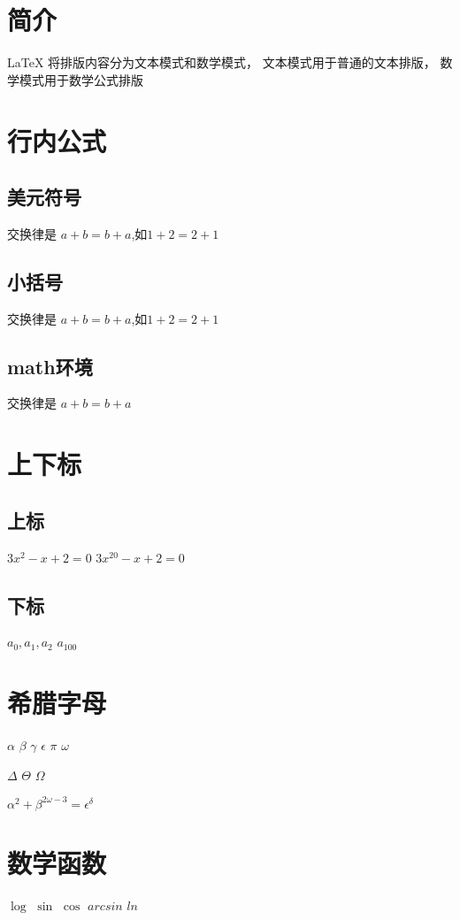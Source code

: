 \documentclass{ctexart}
\begin{document}
    \section{简介}
    LaTeX 将排版内容分为文本模式和数学模式，
    文本模式用于普通的文本排版，
    数学模式用于数学公式排版
    \section{行内公式}
    \subsection{美元符号}
    交换律是 $a+b=b+a$,如$1+2=2+1$
    \subsection{小括号}
    交换律是 \(a+b=b+a\),如\(1+2=2+1\)
    \subsection{math环境}
    交换律是 
    \begin{math}
        a+b=b+a
    \end{math}

    \section{上下标}
    \subsection{上标}
    $3x^2 - x + 2 = 0$
    $3x^{20} - x + 2 = 0$
    \subsection{下标}
    $a_0,a_1,a_2$
    $a_{100}$
    \section{希腊字母}
    $\alpha$
    $\beta$
    $\gamma$
    $\epsilon$
    $\pi$
    $\omega$

    $\Delta$
    $\Theta$
    $\Omega$

    $\alpha^2 + \beta^{2\omega-3} = \epsilon^{\delta}$
    \section{数学函数}
    $\log$
    $\sin$
    $\cos$
    $arcsin$
    $ln$
\end{document}
